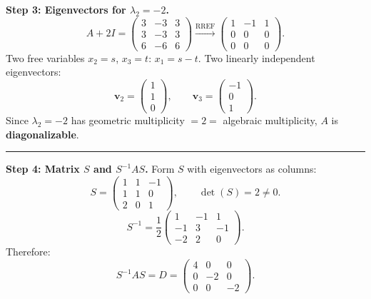 \documentclass[12pt,a3paper]{article}
\begin{document}
\begin{tcolorbox}
\medskip
\textbf{Step 3: Eigenvectors for $\lambda_2 = -2$.}
$$ A + 2I = \begin{pmatrix}3&-3&3\\3&-3&3\\6&-6&6\end{pmatrix} \xrightarrow{\text{RREF}} \begin{pmatrix}1&-1&1\\0&0&0\\0&0&0\end{pmatrix}.$$
Two free variables $x_2 = s$, $x_3 = t$: $x_1 = s - t$.
Two linearly independent eigenvectors:
$$ \mathbf{v}_2 = \begin{pmatrix}1\\1\\0\end{pmatrix}, \qquad \mathbf{v}_3 = \begin{pmatrix}-1\\0\\1\end{pmatrix}.$$
Since $\lambda_2=-2$ has geometric multiplicity $= 2 =$ algebraic multiplicity,
$A$ is \textbf{diagonalizable}.

\medskip\textcolor{cE}{\rule{\textwidth}{0.4pt}}
\textbf{Step 4: Matrix $S$ and $S^{-1}AS$.}
Form $S$ with eigenvectors as columns:
$$ S = \begin{pmatrix}1&1&-1\\1&1&0\\2&0&1\end{pmatrix}, \qquad \det(S) = 2 \neq 0.$$
$$ S^{-1} = \frac{1}{2}\begin{pmatrix}1&-1&1\\-1&3&-1\\-2&2&0\end{pmatrix}.$$
Therefore:
$$ \boxed{S^{-1}AS = D = \begin{pmatrix}4&0&0\\0&-2&0\\0&0&-2\end{pmatrix}.}$$


\end{tcolorbox}
\end{document}
